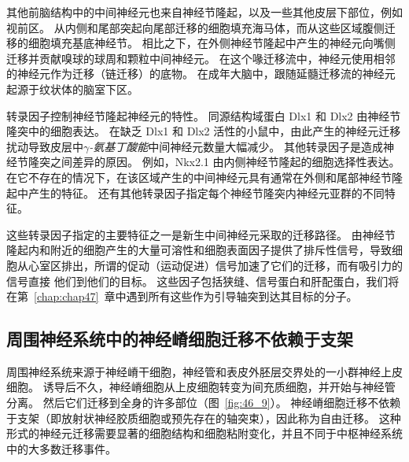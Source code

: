 其他前脑结构中的中间神经元也来自神经节隆起，以及一些其他皮层下部位，例如视前区。
从内侧和尾部突起向尾部迁移的细胞填充海马体，而从这些区域腹侧迁移的细胞填充基底神经节。
相比之下，在外侧神经节隆起中产生的神经元向嘴侧迁移并贡献嗅球的球周和颗粒中间神经元。
在这个喙迁移流中，神经元使用相邻的神经元作为迁移（链迁移）的底物。
在成年大脑中，跟随延髓迁移流的神经元起源于纹状体的脑室下区。


转录因子控制神经节隆起神经元的特性。
同源结构域蛋白 Dlx1 和 Dlx2 由神经节隆突中的细胞表达。
在缺乏 Dlx1 和 Dlx2 活性的小鼠中，由此产生的神经元迁移扰动导致皮层中\textit{$\gamma$-氨基丁酸能}中间神经元数量大幅减少。
其他转录因子是造成神经节隆突之间差异的原因。
例如，Nkx2.1 由内侧神经节隆起的细胞选择性表达。
在它不存在的情况下，在该区域产生的中间神经元具有通常在外侧和尾部神经节隆起中产生的特征。
还有其他转录因子指定每个神经节隆突内神经元亚群的不同特征。


这些转录因子指定的主要特征之一是新生中间神经元采取的迁移路径。
由神经节隆起内和附近的细胞产生的大量可溶性和细胞表面因子提供了排斥性信号，导致细胞从心室区排出，所谓的促动（运动促进）信号加速了它们的迁移，而有吸引力的信号直接 他们到他们的目标。
这些因子包括狭缝、信号蛋白和肝配蛋白，我们将在第~\ref{chap:chap47}~章中遇到所有这些作为引导轴突到达其目标的分子。



\subsection{周围神经系统中的神经嵴细胞迁移不依赖于支架}

周围神经系统来源于神经嵴干细胞，神经管和表皮外胚层交界处的一小群神经上皮细胞。
诱导后不久，神经嵴细胞从上皮细胞转变为间充质细胞，并开始与神经管分离。
然后它们迁移到全身的许多部位（图~\ref{fig:46_9}）。
神经嵴细胞迁移不依赖于支架（即放射状神经胶质细胞或预先存在的轴突束），因此称为自由迁移。
这种形式的神经元迁移需要显著的细胞结构和细胞粘附变化，并且不同于中枢神经系统中的大多数迁移事件。


